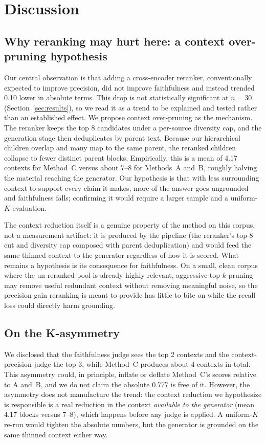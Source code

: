 \documentclass[conference]{IEEEtran}
\begin{document}
\section{Discussion}
\label{sec:discussion}
\subsection{Why reranking may hurt here: a context over-pruning hypothesis}
Our central observation is that adding a cross-encoder reranker, conventionally
expected to improve precision, did not improve faithfulness and instead trended
0.10 lower in absolute terms. This drop is not statistically significant at
$n=30$ (Section~\ref{sec:results}), so we read it as a trend to be explained and
tested rather than an established effect. We propose context over-pruning as the
mechanism. The reranker keeps the top 8 candidates under a per-source diversity
cap, and the generation stage then deduplicates by parent text. Because our
hierarchical children overlap and many map to the same parent, the reranked
children collapse to fewer distinct parent blocks. Empirically, this is a mean of
4.17 contexts for Method~C versus about 7--8 for Methods~A and~B, roughly halving
the material reaching the generator. Our hypothesis is that with less surrounding
context to support every claim it makes, more of the answer goes ungrounded and
faithfulness falls; confirming it would require a larger sample and a uniform-$K$
evaluation.

The context reduction itself is a genuine property of the method on this corpus,
not a measurement artifact: it is produced by the pipeline (the reranker's top-8
cut and diversity cap composed with parent deduplication) and would feed the same
thinned context to the generator regardless of how it is scored. What remains a
hypothesis is its consequence for faithfulness. On a small, clean corpus where the
un-reranked pool is already highly relevant, aggressive top-$k$ pruning may remove
useful redundant context without removing meaningful noise, so the precision gain
reranking is meant to provide has little to bite on while the recall loss could
directly harm grounding.

\subsection{On the K-asymmetry}
We disclosed that the faithfulness judge sees the top 2 contexts and the
context-precision judge the top 3, while Method~C produces about 4 contexts in
total. This asymmetry could, in principle, inflate or deflate Method~C's scores
relative to A and~B, and we do not claim the absolute 0.777 is free of it.
However, the asymmetry does not manufacture the trend: the context reduction we
hypothesize is responsible is a real reduction in the context \emph{available
to the generator} (mean 4.17 blocks versus 7--8), which happens before any judge
is applied. A uniform-$K$ re-run would tighten the absolute numbers, but the
generator is grounded on the same thinned context either way.
\end{document}

